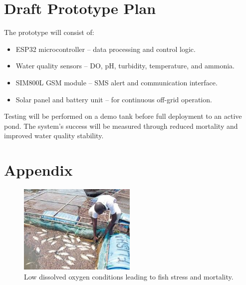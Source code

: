 \documentclass[12pt,a4paper]{article}
\begin{document}
\section{Draft Prototype Plan}
The prototype will consist of:
\begin{itemize}
    \item ESP32 microcontroller – data processing and control logic.
    \item Water quality sensors – DO, pH, turbidity, temperature, and ammonia.
    \item SIM800L GSM module – SMS alert and communication interface.
    \item Solar panel and battery unit – for continuous off-grid operation.
\end{itemize}
Testing will be performed on a demo tank before full deployment to an active pond. The system's success will be measured through reduced mortality and improved water quality stability.

\clearpage {} \renewcommand{\refname}{\centering\bfseries\fontsize{14}{16}\selectfont References} 
 
 
\restoregeometry 
\clearpage 
\appendix \section*{\centering\bfseries\fontsize{14}{16}\selectfont Appendix} 

\begin{figure}[H]
    \centering
    \includegraphics[width=0.5\textwidth]{img/low level.jpg}
    \caption{Low dissolved oxygen conditions leading to fish stress and mortality.}
    \label{fig:oxygen}
\end{figure}
\end{document}
